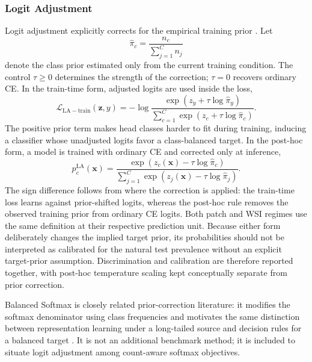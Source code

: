 \documentclass[11pt]{article}
\begin{document}
\subsubsection{Logit Adjustment}
Logit adjustment explicitly corrects for the empirical training prior \citep{menon2021longTail}. Let
\begin{equation}
  \widehat{\pi}_c=\frac{n_c}{\sum_{j=1}^{C}n_j}
  \label{eq:empirical-prior}
\end{equation}
denote the class prior estimated only from the current training condition. The control $\tau\geq0$ determines the strength of the correction; $\tau=0$ recovers ordinary CE. In the train-time form, adjusted logits are used inside the loss,
\begin{equation}
  \mathcal{L}_{\mathrm{LA-train}}(\mathbf z,y)
  =-\log\frac{\exp(z_y+\tau\log\widehat{\pi}_y)}
  {\sum_{c=1}^{C}\exp(z_c+\tau\log\widehat{\pi}_c)}.
  \label{eq:logit-adjustment-train}
\end{equation}
The positive prior term makes head classes harder to fit during training, inducing a classifier whose unadjusted logits favor a class-balanced target. In the post-hoc form, a model is trained with ordinary CE and corrected only at inference,
\begin{equation}
  p_c^{\mathrm{LA}}(\mathbf x)=
  \frac{\exp(z_c(\mathbf x)-\tau\log\widehat{\pi}_c)}
  {\sum_{j=1}^{C}\exp(z_j(\mathbf x)-\tau\log\widehat{\pi}_j)}.
  \label{eq:logit-adjustment-posthoc}
\end{equation}
The sign difference follows from where the correction is applied: the train-time loss learns against prior-shifted logits, whereas the post-hoc rule removes the observed training prior from ordinary CE logits. Both patch and WSI regimes use the same definition at their respective prediction unit. Because either form deliberately changes the implied target prior, its probabilities should not be interpreted as calibrated for the natural test prevalence without an explicit target-prior assumption. Discrimination and calibration are therefore reported together, with post-hoc temperature scaling kept conceptually separate from prior correction.

Balanced Softmax is closely related prior-correction literature: it modifies the softmax denominator using class frequencies and motivates the same distinction between representation learning under a long-tailed source and decision rules for a balanced target \citep{ren2020balancedMeta}. It is not an additional benchmark method; it is included to situate logit adjustment among count-aware softmax objectives.
\end{document}
